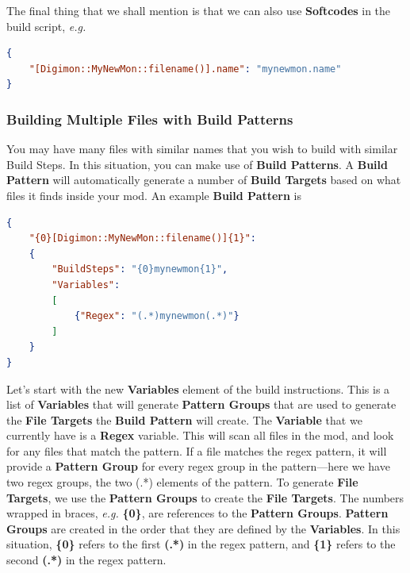 \documentclass{article}
\begin{document}
The final thing that we shall mention is that we can also use \textbf{Softcodes} in the build script, \textit{e.g.}
\begin{lstlisting}[language=json,firstnumber=1]
{
    "[Digimon::MyNewMon::filename()].name": "mynewmon.name"
}
\end{lstlisting}
\subsubsection{Building Multiple Files with Build Patterns}\label{BuildScriptMultipleInstructions}
You may have many files with similar names that you wish to build with similar Build Steps. In this situation, you can make use of \textbf{Build Patterns}. A \textbf{Build Pattern} will automatically generate a number of \textbf{Build Targets} based on what files it finds inside your mod. An example \textbf{Build Pattern} is
\begin{lstlisting}[language=json,firstnumber=1]
{
    "{0}[Digimon::MyNewMon::filename()]{1}":
    {
        "BuildSteps": "{0}mynewmon{1}",
        "Variables":
        [
            {"Regex": "(.*)mynewmon(.*)"}
        ]
    }
}
\end{lstlisting}
Let's start with the new \textbf{Variables} element of the build instructions. This is a list of \textbf{Variables} that will generate \textbf{Pattern Groups} that are used to generate the \textbf{File Targets} the \textbf{Build Pattern} will create. The \textbf{Variable} that we currently have is a \textbf{Regex} variable. This will scan all files in the mod, and look for any files that match the pattern. If a file matches the regex pattern, it will provide a \textbf{Pattern Group} for every regex group in the pattern---here we have two regex groups, the two (.*) elements of the pattern. To generate \textbf{File Targets}, we use the \textbf{Pattern Groups} to create the \textbf{File Targets}. The numbers wrapped in braces, \textit{e.g.} \textbf{\{0\}}, are references to the \textbf{Pattern Groups}. \textbf{Pattern Groups} are created in the order that they are defined by the \textbf{Variables}. In this situation, \textbf{\{0\}} refers to the first \textbf{(.*)} in the regex pattern, and \textbf{\{1\}} refers to the second  \textbf{(.*)} in the regex pattern.
\end{document}
